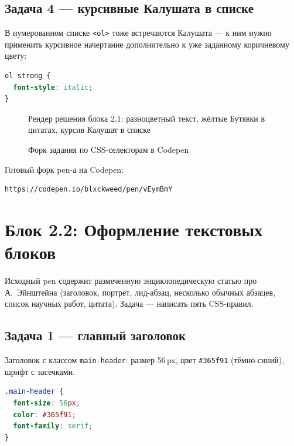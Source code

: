 \subsection{Задача 4 --- курсивные Калушата в списке}

В нумерованном списке \texttt{<ol>} тоже встречаются Калушата ---
к ним нужно применить курсивное начертание дополнительно к уже
заданному коричневому цвету:

\begin{lstlisting}[language=CSS]
ol strong {
  font-style: italic;
}
\end{lstlisting}

\begin{figure}[h]
  \centering
  \caption{Рендер решения блока 2.1: разноцветный текст, жёлтые Бутявки в цитатах, курсив Калушат в списке}
  \label{fig:block_2_1}
\end{figure}

\begin{figure}[h]
  \centering
  \caption{Форк задания по CSS-селекторам в Codepen}
  \label{fig:codepen_fork_21}
\end{figure}

Готовый форк pen-а на Codepen:
\begin{lstlisting}
https://codepen.io/blxckweed/pen/vEymBmY
\end{lstlisting}

\section{Блок 2.2: Оформление текстовых блоков}

Исходный pen содержит размеченную энциклопедическую статью про
А.~Эйнштейна (заголовок, портрет, лид-абзац, несколько обычных
абзацев, список научных работ, цитата). Задача --- написать пять
CSS-правил.

\subsection{Задача 1 --- главный заголовок}

Заголовок с классом \texttt{main-header}: размер 56\,px, цвет
\texttt{\#365f91} (тёмно-синий), шрифт с засечками.

\begin{lstlisting}[language=CSS]
.main-header {
  font-size: 56px;
  color: #365f91;
  font-family: serif;
}
\end{lstlisting}

